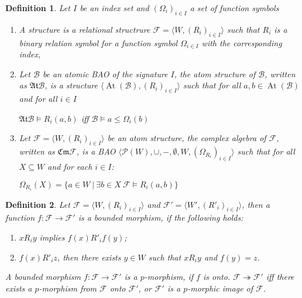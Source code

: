 \documentclass[a4paper]{article}
\theoremstyle{defin}
\newtheorem{defin}{Definition}
\theoremstyle{theorem}
\theoremstyle{prop}
\theoremstyle{lemma}
\theoremstyle{fact}
\theoremstyle{ex}
\theoremstyle{col}
\begin{document}
\begin{defin}  Let $I$ be an index set and $(\Omega_i)_{i \in I}$ a set of function symbols
\begin{enumerate}
  \item A structure is a relational structrure
  $\mathcal{F} = \langle W, (R_{i})_{i \in I} \rangle$
  such that $R_{i}$ is a binary relation symbol for a function symbol $\Omega_{i \in I}$ with the corresponding index,
  \item Let $\mathcal{B}$ be an atomic BAO of the signature $I$,
the atom structure of $\mathcal{B}$, written as $\mathfrak{At} \mathcal{B}$, is a structure $\langle \operatorname{At}(\mathcal{B}), (R_{i})_{i \in I} \rangle$ such that for all
$a, b \in \operatorname{At}(\mathcal{B})$ and for all $i \in I$
\begin{center}
  $\mathfrak{At} \mathcal{B} \models R_{i}(a,b)$ iff $\mathcal{B} \models a \leq \Omega_{i}(b)$
\end{center}
\item Let $\mathcal{F} = \langle W, (R_{i})_{i \in I} \rangle$ be an atom structure, the complex algebra of $\mathcal{F}$, written as $\mathfrak{Cm} \mathcal{F}$, is a BAO
$\langle \mathcal{P}(W), \cup, -, \emptyset, W, (\Omega_{R_{i}})_{i \in I} \rangle$ such that
for all $X \subseteq W$ and for each $i \in I$:
\begin{center}
  $\Omega_{R_{i}}(X) = \{ a \in W \: | \: \exists b \in X \: \mathcal{F} \models R_{i}(a, b)\}$
\end{center}
\end{enumerate}
\end{defin}

\begin{defin} Let $\mathcal{F} = \langle W, (R_{i})_{i \in I} \rangle$ and $\mathcal{F}' = \langle W', ({R'}_{i})_{i \in I} \rangle$, then a function $f : \mathcal{F} \to \mathcal{F}'$ is a bounded morphism, if the following holds:
\begin{enumerate}
\item $x R_i y$ implies $f(x) {R'}_i f(y)$;
\item $f(x) {R'}_i z$, then there exists $y \in W$ such that $x R_i y$ and $f(y) = z$.
\end{enumerate}
A bounded morphism $f : \mathcal{F} \to \mathcal{F}'$ is a $p$-morphism, if $f$ is onto. $\mathcal{F} \twoheadrightarrow \mathcal{F}'$ iff there exists a $p$-morphism from $\mathcal{F}$ onto $\mathcal{F}'$, or $\mathcal{F}'$ is a $p$-morphic image of $\mathcal{F}$.
\end{defin}
\end{document}
